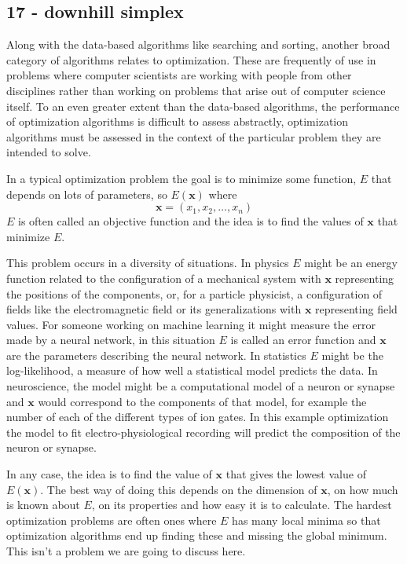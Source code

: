 \documentclass[11pt,a4paper]{scrartcl}
\begin{document}
\subsection*{17 - downhill simplex}

Along with the data-based algorithms like searching and sorting,
another broad category of algorithms relates to optimization. These
are frequently of use in problems where computer scientists are
working with people from other disciplines rather than working on
problems that arise out of computer science itself. To an even greater
extent than the data-based algorithms, the performance of optimization
algorithms is difficult to assess abstractly, optimization algorithms
must be assessed in the context of the particular problem they are
intended to solve.

In a typical optimization problem the goal is to minimize some
function, $E$ that depends on lots of parameters, so $E(\mathbf{x})$ where
\begin{equation}
\mathbf{x}=(x_1,x_2,\ldots,x_n)
\end{equation}
$E$ is often called an objective function and the idea is to find the values of $\mathbf{x}$ that minimize $E$.

This problem occurs in a diversity of situations. In physics $E$
might be an energy function related to the configuration of a
mechanical system with $\mathbf{x}$ representing the positions of the
components, or, for a particle physicist, a configuration of fields
like the electromagnetic field or its generalizations with
$\mathbf{x}$ representing field values. For someone working on machine
learning it might measure the error made by a neural network, in this
situation $E$ is called an error function and $\mathbf{x}$ are the
parameters describing the neural network. In statistics $E$ might be
the log-likelihood, a measure of how well a statistical model predicts
the data. In neuroscience, the model might be a computational model of
a neuron or synapse and $\mathbf{x}$ would correspond to the
components of that model, for example the number of each of the
different types of ion gates. In this example optimization the model
to fit electro-physiological recording will predict the composition of
the neuron or synapse.

In any case, the idea is to find the value of $\mathbf{x}$ that gives
the lowest value of $E(\mathbf{x})$. The best way of doing this
depends on the dimension of $\mathbf{x}$, on how much is known about
$E$, on its properties and how easy it is to calculate. The hardest
optimization problems are often ones where $E$ has many local minima
so that optimization algorithms end up finding these and missing the
global minimum. This isn't a problem we are going to discuss here.
\end{document}
